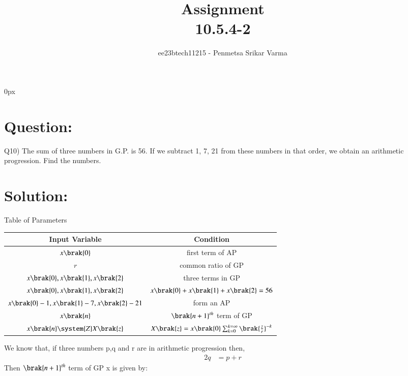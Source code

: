 \documentclass[beamer]{IEEEtran}
\theoremstyle{remark}
\begin{document}
\parindent 0px


\title{Assignment\\[1ex]10.5.4-2}
\author{ee23btech11215 - Penmetsa Srikar Varma$^{}$%
}
\maketitle
\newpage
\bigskip

\renewcommand{\thefigure}{\theenumi}
\renewcommand{\thetable}{\theenumi}
\section*{Question:}
Q10) The sum of three numbers in G.P. is 56. If we subtract 1, 7, 21 from these numbers in that order, we obtain an arithmetic progression. Find the numbers.
\section*{Solution:}
{\centering
Table of Parameters\\
}
\begin{table}[h]
    \centering
    \begin{tabular}{|c|c|}
        \hline
         Input Variable & Condition\\
        \hline
         $x\brak{0}$ & first term of AP\\
         \hline
         $r$ & common ratio of GP\\
         \hline
         $x\brak{0},x\brak{1},x\brak{2}$ & three terms in GP \\
         \hline
         $x\brak{0},x\brak{1},x\brak{2}$ & $x\brak{0}+x\brak{1}+x\brak{2}=56$ \\
         \hline
          $x\brak{0}-1,x\brak{1}-7,x\brak{2}-21$ & form an AP \\
         \hline
          $x\brak{n}$ & $\brak{n+1}^{th}$ term of GP \\
         \hline
         $x\brak{n}\system{Z}X\brak{z}$ & $X\brak{z}=x\brak{0}\sum_{k=0}^{k=\infty}\brak{\frac{z}{r}}^{-k}$\\
         \hline
    \end{tabular}
     \label{tab:t1}
\end{table}
We know that, if three numbers p,q and r are in arithmetic progression then,
\begin{align}
\label{q1}
2q &= p + r
\end{align}
Then $\brak{n+1}^{th}$ term of GP x is given by:
\end{document}
